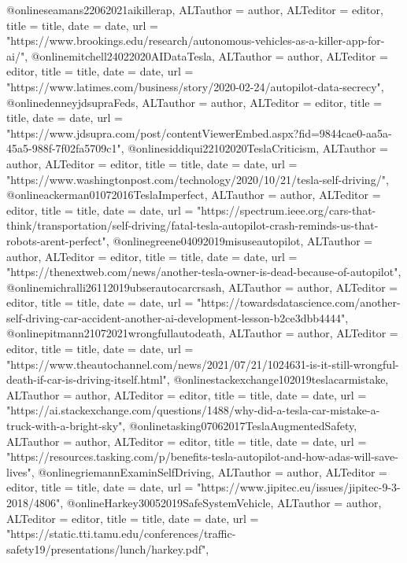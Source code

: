 {{{@online{seamans22062021aikillerap,	ALTauthor = {author},	ALTeditor = {editor},	title = {title},	date = {date},	url = {"https://www.brookings.edu/research/autonomous-vehicles-as-a-killer-app-for-ai/"},}
@online{mitchell24022020AIDataTesla,	ALTauthor = {author},	ALTeditor = {editor},	title = {title},	date = {date},	url = {"https://www.latimes.com/business/story/2020-02-24/autopilot-data-secrecy"},}
@online{denneyjdsupraFeds,	ALTauthor = {author},	ALTeditor = {editor},	title = {title},	date = {date},	url = {"https://www.jdsupra.com/post/contentViewerEmbed.aspx?fid=9844cae0-aa5a-45a5-988f-7f02fa5709c1"},}
@online{siddiqui22102020TeslaCriticism,	ALTauthor = {author},	ALTeditor = {editor},	title = {title},	date = {date},	url = {"https://www.washingtonpost.com/technology/2020/10/21/tesla-self-driving/"},}
@online{ackerman01072016TeslaImperfect,	ALTauthor = {author},	ALTeditor = {editor},	title = {title},	date = {date},	url = {"https://spectrum.ieee.org/cars-that-think/transportation/self-driving/fatal-tesla-autopilot-crash-reminds-us-that-robots-arent-perfect"},}
@online{greene04092019misuseautopilot,	ALTauthor = {author},	ALTeditor = {editor},	title = {title},	date = {date},	url = {"https://thenextweb.com/news/another-tesla-owner-is-dead-because-of-autopilot"},}
@online{michralli26112019ubserautocarcrsash,	ALTauthor = {author},	ALTeditor = {editor},	title = {title},	date = {date},	url = {"https://towardsdatascience.com/another-self-driving-car-accident-another-ai-development-lesson-b2ce3dbb4444"},}
@online{pitmann21072021wrongfullautodeath,	ALTauthor = {author},	ALTeditor = {editor},	title = {title},	date = {date},	url = {"https://www.theautochannel.com/news/2021/07/21/1024631-is-it-still-wrongful-death-if-car-is-driving-itself.html"},}
@online{stackexchange102019teslacarmistake,	ALTauthor = {author},	ALTeditor = {editor},	title = {title},	date = {date},	url = {"https://ai.stackexchange.com/questions/1488/why-did-a-tesla-car-mistake-a-truck-with-a-bright-sky"},}
@online{tasking07062017TeslaAugmentedSafety,	ALTauthor = {author},	ALTeditor = {editor},	title = {title},	date = {date},	url = {"https://resources.tasking.com/p/benefits-tesla-autopilot-and-how-adas-will-save-lives"},}
@online{griemannExaminSelfDriving,	ALTauthor = {author},	ALTeditor = {editor},	title = {title},	date = {date},	url = {"https://www.jipitec.eu/issues/jipitec-9-3-2018/4806"},}
@online{Harkey30052019SafeSystemVehicle,	ALTauthor = {author},	ALTeditor = {editor},	title = {title},	date = {date},	url = {"https://static.tti.tamu.edu/conferences/traffic-safety19/presentations/lunch/harkey.pdf"},}
}}}
